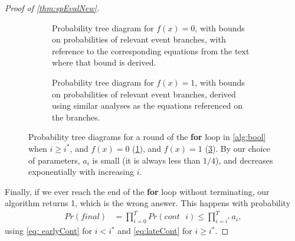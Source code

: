 \documentclass[cleveref, autoref, thm-restate,11pt]{article}
\theoremstyle{definition}
\newcommand{\PrCont}[1][i]{Pr(cont\textrm{ }#1)} %
\begin{document}
\begin{proof}[Proof of \cref{thm:spEvalNew}]
\begin{figure}
\centering
\begin{subfigure}[t]{.45\textwidth}
    \caption{Probability tree diagram for $f(x)=0$, with bounds on probabilities of relevant event branches, with reference to the corresponding equations from the text where that bound is derived.}
    \label{fig:f0}
\end{subfigure}
\hfill
\begin{subfigure}[t]{.45\textwidth}
    \caption{Probability tree diagram for $f(x)=1$, with bounds on probabilities of relevant event branches, derived using similar analyses as the equations referenced on the branches.}
    \label{fig:f1}
\end{subfigure}
\caption{Probability tree diagrams for a round of the \textbf{for} loop
 in \cref{alg:bool} when $i\geq i^*$, and $f(x)=0$ (\cref{fig:f0}), and 
 $f(x)=1$ (\cref{fig:f1}). By our choice of parameters, $a_i$ is small (it is
 always less than $1/4$), and decreases exponentially with increasing $i$.}
\end{figure}

Finally, if we ever reach the end of the \textbf{for} loop without terminating, our algorithm returns 1, 
which is the wrong answer. This happens with probability 
\begin{align}
    Pr(final) &= \prod_{i=0}^{T} \PrCont \leq \prod_{i=i^*}^T a_i, \label{eq:prfinal} 
\end{align}
using \cref{eq: earlyCont}  for $i<i^*$ and \cref{eq:lateCont} for $i\geq i^*$.



\end{proof}
\end{document}
